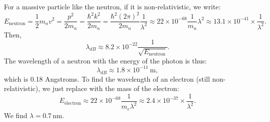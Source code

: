 \begin{breakbox}
    \noindent For a massive particle like the neutron, if it is non-relativistic, we write:
    \begin{equation*}
        E_{\text{neutron}} = \frac{1}{2}m_nv^2 = \frac{p^2}{2m_n} = \frac{\hbar^2 k^2}{2m_n} = \frac{\hbar^2(2\pi)^2}{2m_n}\frac{1}{\lambda^2} \approx 22 \times 10^{-68} \frac{1}{m_n}{\lambda^2} \approx 13.1 \times 10^{-41} \times \frac{1}{\lambda^2}.
    \end{equation*}
    Then,
    \begin{equation*}
        \boxed{\lambda_{dB} \approx 8.2 \times 10^{-22} \frac{1}{\sqrt{E_{\text{neutron}}}}.}
    \end{equation*}
    The wavelength of a neutron with the energy of the photon is thus:
    $$\boxed{\lambda_{dB} \approx 1.8\times 10^{-11} \: \text{m},}$$ 
    which is 0.18 Angstroms.
    To find the wavelength of an electron (still non-relativistic), we just replace with the mass of the electron:
    $$E_{\text{electron}} \approx 22 \times 10^{-68}\frac{1}{m_e \lambda^2} \approx 2.4 \times 10^{-37} \times \frac{1}{\lambda^2}.$$
    We find $\boxed{\lambda = 0.7 \, \text{nm}.}$
\end{breakbox}